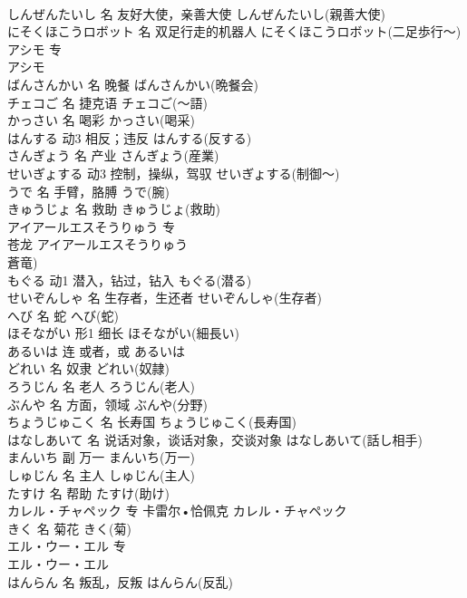 \documentclass[8pt]{extreport}
\begin{document}
\begin{CJK}{UTF8}{min}
\\	しんぜんたいし	名	友好大使，亲善大使	しんぜんたいし(親善大使)	
\\	にそくほこうロボット	名	双足行走的机器人	にそくほこうロボット(二足歩行～)	
\\	アシモ	专	
\\	アシモ
\\	ばんさんかい	名	晚餐	ばんさんかい(晩餐会)	
\\	チェコご	名	捷克语	チェコご(～語)	
\\	かっさい	名	喝彩	かっさい(喝采)	
\\	はんする	动3	相反；违反	はんする(反する)	
\\	さんぎょう	名	产业	さんぎょう(産業)	
\\	せいぎょする	动3	控制，操纵，驾驭	せいぎょする(制御～)	
\\	うで	名	手臂，胳膊	うで(腕)	
\\	きゅうじょ	名	救助	きゅうじょ(救助)	
\\	アイアールエスそうりゅう	专	
\\	苍龙	アイアールエスそうりゅう
\\	蒼竜)	
\\	もぐる	动1	潜入，钻过，钻入	もぐる(潜る)	
\\	せいぞんしゃ	名	生存者，生还者	せいぞんしゃ(生存者)	
\\	へび	名	蛇	へび(蛇)	
\\	ほそながい	形1	细长	ほそながい(細長い)	
\\	あるいは	连	或者，或	あるいは	
\\	どれい	名	奴隶	どれい(奴隷)	
\\	ろうじん	名	老人	ろうじん(老人)	
\\	ぶんや	名	方面，领域	ぶんや(分野)	
\\	ちょうじゅこく	名	长寿国	ちょうじゅこく(長寿国)	
\\	はなしあいて	名	说话对象，谈话对象，交谈对象	はなしあいて(話し相手)	
\\	まんいち	副	万一	まんいち(万一)	
\\	しゅじん	名	主人	しゅじん(主人)	
\\	たすけ	名	帮助	たすけ(助け)	
\\	カレル・チャペック	专	卡雷尔•恰佩克	カレル・チャペック	
\\	きく	名	菊花	きく(菊)	
\\	エル・ウー・エル	专	
\\	エル・ウー・エル
\\	はんらん	名	叛乱，反叛	はんらん(反乱)	

\end{CJK}
\end{document}
